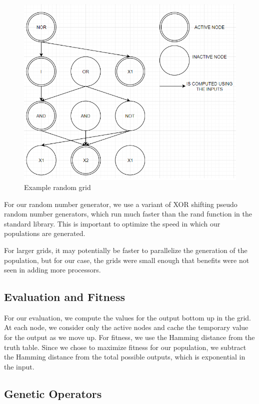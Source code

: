 \documentclass{article}
\begin{document}
	\begin{figure}
		\centering
		\includegraphics[width=\textwidth]{sample1.png}
		\caption{Example random grid}
		\label{sample1}
	\end{figure}
	
	For our random number generator, we use a variant of XOR shifting pseudo random number generators, which run much faster than the rand function in the standard library. This is important to optimize the speed in which our populations are generated.
	
	For larger grids, it may potentially be faster to parallelize the generation of the population, but for our case, the grids were small enough that benefits were not seen in adding more processors.

	\subsection{Evaluation and Fitness}
	For our evaluation, we compute the values for the output bottom up in the grid. At each node, we consider only the active nodes and cache the temporary value for the output as we move up. For fitness, we use the Hamming distance from the truth table. Since we chose to maximize fitness for our population, we subtract the Hamming distance from the total possible outputs, which is exponential in the input.
	
	\subsection{Genetic Operators}
\end{document}
